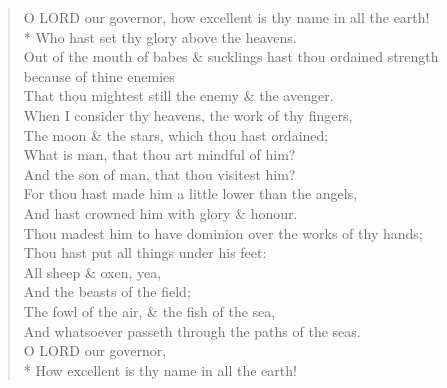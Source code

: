 \documentclass[MAIN]{subfiles}
\begin{document}
\begin{verse}
O {\hge LORD} our governor, how excellent is thy name in all the earth!\\*
\vin Who hast set thy glory above the heavens.\\
Out of the mouth of babes \& sucklings hast thou ordained strength because of thine enemies\\
\vin That thou mightest still the enemy \& the avenger.\\
When I consider thy heavens, the work of thy fingers,\\
\vin The moon \& the stars, which thou hast ordained;\\
What is man, that thou art mindful of him?\\
\vin And the son of man, that thou visitest him?\\
For thou hast made him a little lower than the angels,\\
\vin And hast crowned him with glory \& honour.\\
Thou madest him to have dominion over the works of thy hands;\\
\vin Thou hast put all things under his feet:\\
All sheep \& oxen, yea,\\
\vin And the beasts of the field;\\
The fowl of the air, \& the fish of the sea,\\
\vin And whatsoever passeth through the paths of the seas.\\
O {\hge LORD} our governor,\\*
\vin How excellent is thy name in all the earth!
\end{verse}
\end{document}
